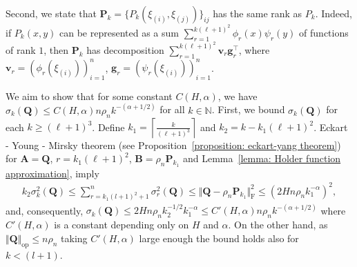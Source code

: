 \documentclass[11pt]{article}
\newcommand{\op}{\mathrm{op}}
\newcommand{\bA}{\bm{A}}
\newcommand{\bB}{\bm{B}}
\newcommand{\bQ}{\bm{Q}}
\newcommand{\bv}{\bm{v}}
\newcommand{\bg}{\bm{g}}
\newcommand{\bP}{\bm{P}}
\newcommand{\bbN}{\mathbb{N}}
\newcommand{\<}{\langle}
\renewcommand{\>}{\rangle}
\theoremstyle{plain}
\theoremstyle{definition}
\theoremstyle{remark}
\begin{document}
{Second, we state that $\bP_k = \{P_k(\xi_{(i)}, \xi_{(j)})\}_{ij}$ has the same rank as $P_k$. Indeed, if $P_k(x, y)$ can be represented as a sum $\sum_{r = 1}^{k (\ell + 1)^2} \phi_r(x) \psi_r(y)$ of functions of rank $1$, then $\bP_k$ has decomposition $\sum_{r = 1}^{k (\ell + 1)^2} \bv_r \bg_r^\top$, where $\bv_r = (\phi_r(\xi_{(i)}))_{i = 1}^n$, $\bg_r = (\psi_r(\xi_{(i)}))_{i = 1}^n$.

We aim to show that for some constant $C(H,\alpha)$, we have $\sigma_k(\bQ) \le C(H, \alpha) n \rho_n k^{-(\alpha + 1/2)}$ for all $k \in \bbN$. First, we bound $\sigma_{k} (\bQ)$ for each $k \ge (\ell + 1)^3$. Define $k_1 = \left \lceil \frac{k}{(\ell + 1)^3} \right \rceil$ and $k_2 = k - k_1 (\ell + 1)^2$.
Eckart - Young - Mirsky theorem (see Proposition~\ref{proposition: eckart-yang theorem}) for $\bA=\bQ$, $r=k_1 (\ell+1)^2$, $\bB=\rho_n \bP_{k_1}$  and
Lemma~\ref{lemma: Holder function approximation}, imply
\begin{align*}
	k_2 \sigma^2_k(\bQ) \le \sum_{r = k_1 (l + 1)^2 + 1}^n \sigma_r^2(\bQ) \le  \Vert \bQ - \rho_n \bP_{k_1} \Vert_{\mathrm{F}}^2 \le (2 H n \rho_n k_1^{-\alpha})^2 ,
\end{align*}
and, consequently, $\sigma_k(\bQ) \le 2 H n \rho_n k_2^{-1/2} k_1^{-\alpha}\leq C'(H, \alpha) n \rho_n k^{-(\alpha + 1/2)}$ where $C'(H, \alpha)$ is a constant depending only on $H$ and $\alpha$. 
On the other hand, as $\Vert \bQ \Vert_{\op} \le n \rho_n$ taking $C'(H, \alpha)$ large enough the bound holds also for  $k<(l+1)$.

 
  

}
\end{document}
